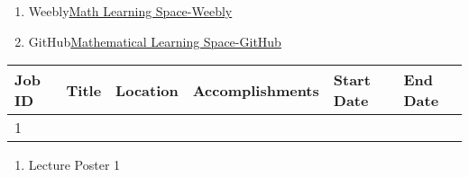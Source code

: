 \documentclass{ResumeDesignFormat1}
\begin{document}
\begin{enumerate}
\item {Weebly}{\href{http://mathlearningspace.weebly.com/}{\textcolor{c5}{Math Learning Space-Weebly}}}
\item {GitHub}{\href{https://github.com/MathematicalLearningSpace}{\textcolor{c5}{Mathematical Learning Space-GitHub}}}
\end{enumerate}
\begin{table}[H]\centering
\tiny
\begin{tabular}{p{1cm}p{4cm}p{3cm}p{2cm}p{2cm}p{2cm}}
Job ID & Title & Location & Accomplishments & Start Date & End Date \\
\hline
1 & & & & & \\
\hline
\end{tabular}
\end{table}

\begin{enumerate}
\item Lecture Poster 1
\end{enumerate}
\end{document}
